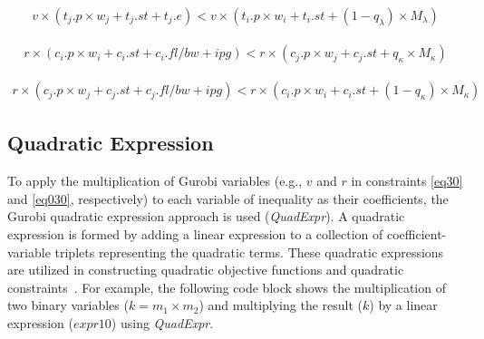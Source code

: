     \begin{equation*}
    	\begin{split}	
    	v \times ({t_j}.{p} \times {w_j} + {t_j}.{st} + {t_j}.{e}) < 
    	v \times ({t_i}.{p} \times {w_i} +  {t_i}.{st} + (1-q_\lambda)\times M_\lambda)
    	\label{}
    	\end{split}
    \end{equation*}
    
        \begin{equation}
    	\begin{split}	
    	r \times ({c_i}.{p} \times {w_i} + {c_i}.{st} + {c_i}.{fl}/bw + ipg) <
        r \times ({c_j}.{p} \times {w_j} +  {c_j}.{st} + q_\kappa \times M_\kappa)
    	\label{eq030}
    	\end{split}
    \end{equation}
    
    \begin{equation*}
    	\begin{split}	
    	r \times ({c_j}.{p} \times {w_j} + {c_j}.{st} + {c_j}.{fl}/bw + ipg ) < 
    	r \times ({c_i}.{p} \times {w_i} +  {c_i}.{st} + (1-q_\kappa)\times M_\kappa)
    	\label{}
    	\end{split}
    \end{equation*}
    
    
    
    
    
    \subsection{Quadratic Expression}
    To apply the multiplication of Gurobi variables (e.g., $v$ and $r$ in constraints \eqref{eq30} and \eqref{eq030}, respectively) to each variable of inequality as their coefficients, the Gurobi quadratic expression approach is used (\textit{QuadExpr}). 
    A quadratic expression is formed by adding a linear expression to a collection of coefficient-variable triplets representing the quadratic terms. These quadratic expressions are utilized in constructing quadratic objective functions and quadratic constraints~\cite{gurobi}. For example, the following code block shows the multiplication of two binary variables ($k = m_1 \times m_2$) and multiplying the result ($k$) by a linear expression ($expr10$) using \textit{QuadExpr}.\newline
 
